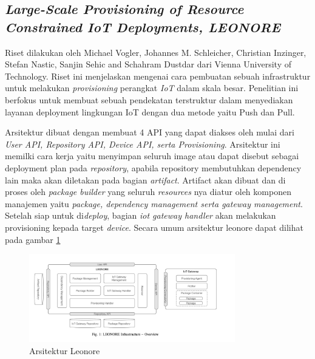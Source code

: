 \subsection{\textit{Large-Scale Provisioning of
    Resource Constrained
    IoT Deployments, LEONORE}}
Riset dilakukan oleh Michael Vogler, Johannes M. Schleicher, Christian Inzinger, Stefan Nastic, Sanjin Sehic and Schahram Dustdar dari Vienna University of Technology. Riset ini menjelaskan mengenai cara pembuatan sebuah infrastruktur untuk melakukan \textit{provisioning} perangkat \textit{IoT} dalam skala besar. Penelitian ini berfokus untuk membuat sebuah pendekatan terstruktur dalam menyediakan layanan deployment lingkungan IoT dengan dua metode yaitu Push dan Pull.

Arsitektur dibuat dengan membuat 4 API yang dapat diakses oleh mulai dari  \textit{User API, Repository API, Device API, serta Provisioning}. Arsitektur ini memilki cara kerja yaitu menyimpan seluruh image atau dapat disebut sebagai deployment plan pada \textit{repository}, apabila repository membutuhkan dependency lain maka akan diletakan pada bagian \textit{artifact}. Artifact akan dibuat dan di proses oleh \textit{package builder} yang seluruh \textit{resources} nya diatur oleh komponen manajemen yaitu \textit{package, dependency management serta gateway management}. Setelah siap untuk di\textit{deploy}, bagian \textit{iot gateway handler} akan melakukan provisioning kepada target \textit{device}. Secara umum arsitektur leonore dapat dilihat pada gambar \ref{fig:arsitektur-leonore}

\begin{figure}[ht]
  \centering
  \includegraphics[width=0.8\textwidth]{resources/chapter-2/arsitektur-leonore.jpg}
  \caption{Arsitektur Leonore}
  \label{fig:arsitektur-leonore}
\end{figure}
